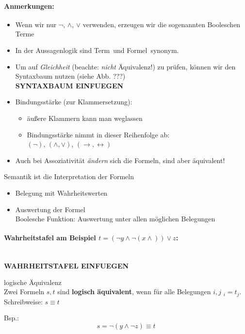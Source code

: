 \paragraph{Anmerkungen:}
\begin{itemize}
\item Wenn wir nur $\neg$, $\land$, $\lor$ verwenden, erzeugen wir die sogenannten \glq Booleschen Terme\grq
\item In der Aussagenlogik sind \glq Term\grq\ und \glq Formel\grq\ synonym.
\item Um auf \emph{Gleichheit} (beachte: \emph{nicht} Äquivalenz!) zu prüfen, können wir den Syntaxbaum nutzen (siehe Abb. ???)
\\ \textbf{SYNTAXBAUM EINFUEGEN}
\item Bindungsstärke (zur Klammersetzung):
\begin{itemize}
\item äußere Klammern kann man weglassen
\item Bindungsstärke nimmt in dieser Reihenfolge ab: \\
$(\neg)$, $(\land,\lor)$, $(\rightarrow, \leftrightarrow)$
\end{itemize}
\item Auch bei Assoziativität \emph{ändern} sich die Formeln, sind aber äquivalent!
\end{itemize}
\begin{defi}[Semantik]
Semantik ist die Interpretation der Formeln
\begin{itemize}
\item Belegung mit Wahrheitswerten
\item Auswertung der Formel\\
Boolesche Funktion: Auswertung unter allen möglichen Belegungen
\end{itemize}
\end{defi}
%
\paragraph{Wahrheitstafel am Beispiel $t = (\neg y \land \neg(x \land) ) \lor z$:}
\ \\ \textbf{WAHRHEITSTAFEL EINFUEGEN}
%
\begin{defi}{logische Äquivalenz}
\\Zwei Formeln $s,t$ sind \textbf{logisch äquivalent}, wenn für alle Belegungen $i,j$ $_i = t_j$.\\
Schreibweise: $s \equiv t$

Bsp.:
\[ s = \neg( y \land \neg z ) \equiv t \]
\end{defi}
%
